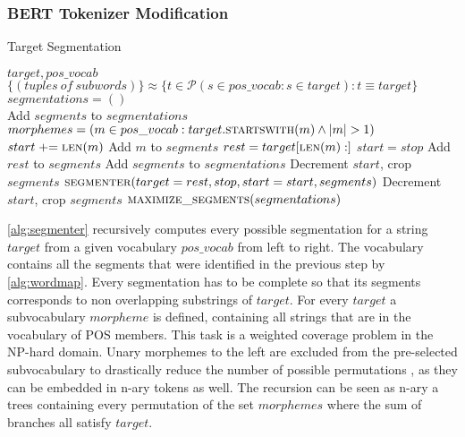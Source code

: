 \subsubsection{BERT Tokenizer Modification}
\label{subsubsec:tokenizer-modification}


\begin{algorithm}
    \caption{Target Segmentation}\label{alg:segmenter}
    \begin{algorithmic}[1]
        \Require $target,pos\_vocab$ 
        \Ensure $\{(tuples\:of\:subwords)\} \approx \{ t \in \mathcal{P} (s \in pos\_vocab : s \in target) : t \equiv target\}$
        \\
        \State $segmentations = ()$
        \\

            \State Add $segments$ to $segmentations$
        \Else
            \State $morphemes = (m \in pos\_vocab : target. \textsc{startswith}(m) \wedge |m|>1)$
                \State $start \mathrel{+}= \textsc{len}(m)$
                \State Add $m$ to $segments$
                \State $rest = target[\textsc{len}(m):]$
                    \State $start = stop$
                    \State Add $rest$ to $segments$
                    \State Add $segments$ to $segmentations$
                    \State Decrement $start$, crop $segments$
                \Else
                    \State $\textsc{segmenter}(target=rest, stop, start=start, segments)$
                    \State Decrement $start$, crop $segments$
                \EndIf
            \EndFor
        \EndIf
        \EndFunction
        \State $\textsc{maximize\_segments}(segmentations)$
    \end{algorithmic}
\end{algorithm}

\autoref{alg:segmenter} recursively computes every possible segmentation for a string $target$ from a given vocabulary $pos\_vocab$ from left to right.
The vocabulary contains all the segments that were identified in the previous step by \autoref{alg:wordmap}.
Every segmentation has to be complete so that its segments corresponds to non overlapping substrings of $target$.
For every $target$ a subvocabulary $morpheme$ is defined, containing all strings that are in the vocabulary of \ac{POS} \- members.
This task is a weighted coverage problem in the \uppercase{NP}-hard domain.
Unary morphemes to the left are excluded from the pre-selected subvocabulary to drastically reduce the number of possible permutations , as they can be embedded in n-ary tokens as well.
The recursion can be seen as n-ary a trees containing every permutation of the set $morphemes$ where the sum of branches all satisfy $target$.

